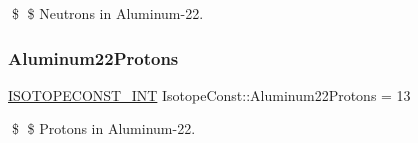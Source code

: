 \$ \$ Neutrons in Aluminum-\/22. \mbox{\label{group___isotope_const-_aluminum-_al22_ga90b8fc84e89a56fbdba52185d2766798}} 
\subsubsection{\texorpdfstring{Aluminum22\+Protons}{Aluminum22Protons}}
{\footnotesize\ttfamily \mbox{\hyperlink{group___isotope_const-_macros_ga5f18360b3e99483a35c32d789e62621c}{I\+S\+O\+T\+O\+P\+E\+C\+O\+N\+S\+T\+\_\+\+I\+NT}} Isotope\+Const\+::\+Aluminum22\+Protons = 13}

\$ \$ Protons in Aluminum-\/22. 